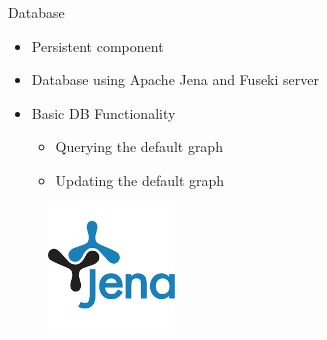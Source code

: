 \begin{frame}{Database}
	\begin{itemize}
		\item Persistent component
		\item Database using Apache Jena and Fuseki server
   		\item Basic DB Functionality
     	\begin{itemize}
			\item Querying the default graph
     		\item Updating the default graph
     	\end{itemize}
    \end{itemize}
	\begin{figure}[htbp]
  		\centering
  		\includegraphics[width=0.3\textwidth]{figures/jena}
	\end{figure}
\end{frame}
